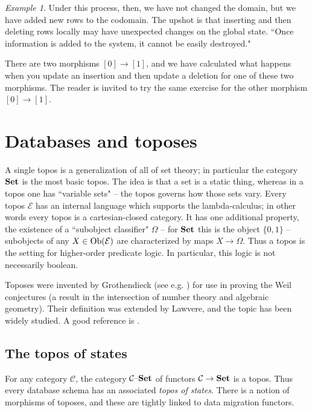 \documentclass{amsart}
\def\tn{\textnormal}
\def\mc{\mathcal}
\def\Ob{\tn{Ob}}
\def\to{\rightarrow}
\def\Set{{\bf Set}}
\def\set{{\text \textendash}{\bf Set}}
\def\mcC{\mc{C}}
\def\mcE{\mc{E}}
\theoremstyle{remark}
\newtheorem{example}[theorem]{Example}
\theoremstyle{definition}
\begin{document}
\begin{example}
Under this process, then, we have not changed the domain, but we have added new rows to the codomain.  The upshot is that inserting and then deleting rows locally may have unexpected changes on the global state.  ``Once information is added to the system, it cannot be easily destroyed."

There are two morphisms $[0]\to[1]$, and we have calculated what happens when you update an insertion and then update a deletion for one of these two morphisms.  The reader is invited to try the same exercise for the other morphism $[0]\to[1]$.


\end{example}

\section{Databases and toposes}\label{sec:topos}

A single topos is a generalization of all of set theory; in particular the category $\Set$ is the most basic topos.  The idea is that a set is a static thing, whereas in a topos one has ``variable sets" -- the topos governs how those sets vary.  Every topos $\mcE$ has an internal language which supports the lambda-calculus; in other words every topos is a cartesian-closed category.  It has one additional property, the existence of a ``subobject classifier" $\Omega$ -- for $\Set$ this is the object $\{0,1\}$ -- subobjects of any $X\in\Ob(\mcE)$ are characterized by maps $X\to\Omega$.  Thus a topos is the setting for higher-order predicate logic.  In particular, this logic is not necessarily boolean.

Toposes were invented by Grothendieck (see e.g. \cite{GV}) for use in proving the Weil conjectures (a result in the intersection of number theory and algebraic geometry).  Their definition was extended by Lawvere, and the topic has been widely studied.  A good reference is \cite{B}.

\subsection{The topos of states}

For any category $\mcC$, the category $\mcC\set$ of functors $\mcC\to\Set$ is a topos.  Thus every database schema has an associated {\em topos of states}.  There is a notion of morphisms of toposes, and these are tightly linked to data migration functors.  
\end{document}
